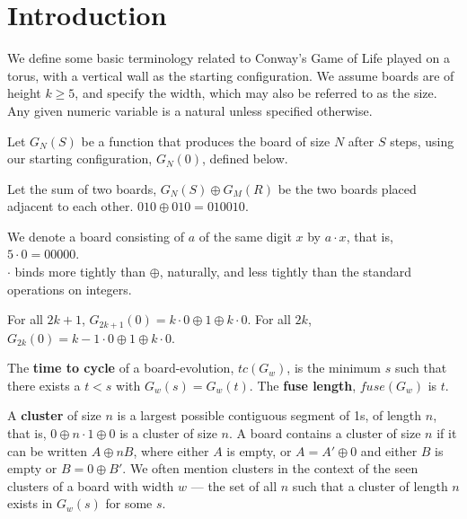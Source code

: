 \documentclass[12pt,letterpaper]{article}
\begin{document}
\section{Introduction}
We define some basic terminology related to Conway's Game of Life played on a torus, with a vertical wall as the starting configuration. We assume boards are of height $k\geq 5$, and specify the width, which may also be referred to as the size. Any given numeric variable is a natural unless specified otherwise. 
\begin{dfn}
  Let $G_N(S)$ be a function that produces the board of size $N$ after $S$ steps, using our starting configuration, $G_N(0)$, defined below.
\end{dfn}
\begin{dfn}
  Let the sum of two boards, $G_N(S)\oplus G_M(R)$ be the two boards placed adjacent to each other. $010\oplus 010 = 010010$.
\end{dfn}
\begin{dfn}
  We denote a board consisting of $a$ of the same digit $x$ by $a\cdot x$, that is, $5\cdot 0=00000$. \\
  $\cdot$ binds more tightly than $\oplus$, naturally, and less tightly than the standard operations on integers. 
\end{dfn}
\begin{dfn}
  For all $2k+1$, $G_{2k+1}(0)= k\cdot 0 \oplus 1 \oplus k\cdot 0$. For all $2k$, $G_{2k}(0) = k-1\cdot 0 \oplus 1 \oplus k\cdot 0$. 
\end{dfn}
\begin{dfn}\label{cycles}
  The {\bf time to cycle} of a board-evolution, $tc(G_w)$, is the minimum $s$ such that there exists a $t<s$ with $G_w(s)=G_w(t)$. The {\bf fuse length}, $fuse(G_w)$ is $t$. 
\end{dfn}
\begin{dfn}\label{cluster}
  A {\bf cluster} of size $n$ is a largest possible contiguous segment of 1s, of length $n$,  that is, $0\oplus n\cdot 1\oplus 0$ is a cluster of size $n$. A board contains a cluster of size $n$ if it can be written $A\oplus n B$, where either $A$ is empty, or $A=A'\oplus 0$ and either $B$ is empty or $B=0\oplus B'$. We often mention clusters in the context of the seen clusters of a board with width $w$ --- the set of all $n$ such that a cluster of length $n$ exists in $G_w(s)$ for some $s$. 
\end{dfn}
\end{document}
